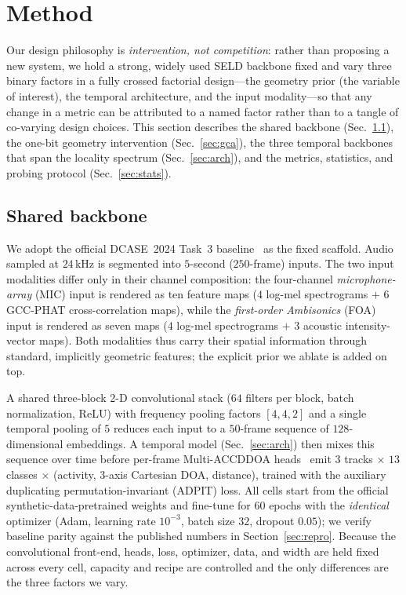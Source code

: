 \section{Method}
\label{sec:method}

Our design philosophy is \emph{intervention, not competition}: rather than
proposing a new system, we hold a strong, widely used SELD backbone fixed and
vary three binary factors in a fully crossed factorial design---the geometry
prior (the variable of interest), the temporal architecture, and the input
modality---so that any change in a metric can be attributed to a named factor
rather than to a tangle of co-varying design choices. This section describes the
shared backbone (Sec.~\ref{sec:backbone}), the one-bit geometry intervention
(Sec.~\ref{sec:gca}), the three temporal backbones that span the locality
spectrum (Sec.~\ref{sec:arch}), and the metrics, statistics, and probing
protocol (Sec.~\ref{sec:stats}).

\subsection{Shared backbone}
\label{sec:backbone}
We adopt the official DCASE~2024 Task~3 baseline~\cite{krause2024sde} as the
fixed scaffold. Audio sampled at $24$\,kHz is segmented into $5$-second
($250$-frame) inputs. The two input modalities differ only in their channel
composition: the four-channel \emph{microphone-array} (MIC) input is rendered as
ten feature maps ($4$ log-mel spectrograms $+$ $6$ GCC-PHAT cross-correlation
maps), while the \emph{first-order Ambisonics} (FOA) input is rendered as seven
maps ($4$ log-mel spectrograms $+$ $3$ acoustic intensity-vector maps). Both
modalities thus carry their spatial information through standard, implicitly
geometric features; the explicit prior we ablate is added on top.

A shared three-block 2-D convolutional stack ($64$ filters per block, batch
normalization, ReLU) with frequency pooling factors $[4,4,2]$ and a single
temporal pooling of $5$ reduces each input to a $50$-frame sequence of
$128$-dimensional embeddings. A temporal model (Sec.~\ref{sec:arch}) then mixes
this sequence over time before per-frame Multi-ACCDDOA
heads~\cite{shimada2022multiaccdoa} emit $3$ tracks $\times$ $13$ classes
$\times$ (activity, $3$-axis Cartesian DOA, distance), trained with the auxiliary
duplicating permutation-invariant (ADPIT) loss. All cells start from the official
synthetic-data-pretrained weights and fine-tune for $60$ epochs with the
\emph{identical} optimizer (Adam, learning rate $10^{-3}$, batch size $32$,
dropout $0.05$); we verify baseline parity against the published numbers in
Section~\ref{sec:repro}. Because the convolutional front-end, heads, loss,
optimizer, data, and width are held fixed across every cell, capacity and recipe
are controlled and the only differences are the three factors we vary.


